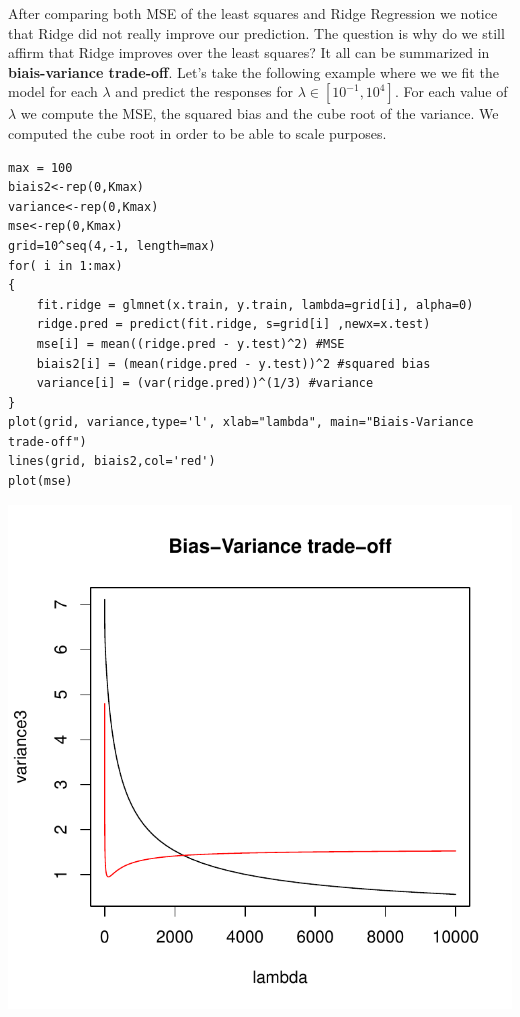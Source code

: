 \documentclass[]{report}
\begin{document}
After comparing both MSE of the least squares and Ridge Regression we notice that Ridge did not really improve our prediction. The question is why do we still affirm that Ridge improves over the least squares? It all can be summarized in\textbf{ biais-variance trade-off}. Let's take the following example where we we fit the model for each $\lambda$ and predict the responses for $\lambda\in[10^{-1},10^{4}]$. For each value of $\lambda$ we compute the MSE, the squared bias and the cube root of the variance. We computed the cube root in order to be able to scale purposes.
\begin{lstlisting}
max = 100
biais2<-rep(0,Kmax)
variance<-rep(0,Kmax) 
mse<-rep(0,Kmax)
grid=10^seq(4,-1, length=max)
for( i in 1:max)
{     
	fit.ridge = glmnet(x.train, y.train, lambda=grid[i], alpha=0)
	ridge.pred = predict(fit.ridge, s=grid[i] ,newx=x.test)
	mse[i] = mean((ridge.pred - y.test)^2) #MSE
	biais2[i] = (mean(ridge.pred - y.test))^2 #squared bias
	variance[i] = (var(ridge.pred))^(1/3) #variance
}
plot(grid, variance,type='l', xlab="lambda", main="Biais-Variance trade-off")
lines(grid, biais2,col='red')
plot(mse)
\end{lstlisting}

\begin{center}
	\includegraphics{Figures/ridge_biais_var.pdf}
\end{center}
\end{document}
